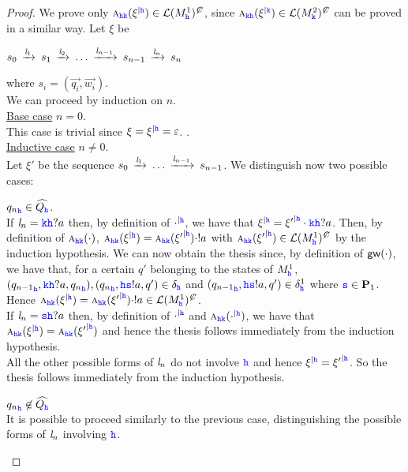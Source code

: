 \begin{proof}
We prove only $\symb{\HH\KK}{\restrictup{\xi}{\HH}}\in\lang{M^1_\HH}^\mC$, since 
$\symb{\KK\HH}{\restrictup{\xi}{\KK}}\in\lang{M^2_\KK}^\mC$ can be proved in a similar way.
Let $\xi$ be\\
\centerline{
$s_0\lts{\elle_1}s_1\lts{\elle_2} \ldots \lts{\elle_{n-1}}s_{n-1}\lts{\elle_n}s_n$
}
where $s_i=({\vec{q_i}},{\vec{w_i}})$.\\
We can proceed by  induction on $n$.\\
\underline{Base case} $n=0$. \\
This case is trivial since $\xi = \restrictup{\xi}{\HH}=\varepsilon$. .\\
\underline{Inductive case} $n\neq 0$.\\
Let $\xi'$ be the sequence $s_0\lts{\elle_1} \ldots \lts{\elle_{n-1}}s_{n-1}$.
We distinguish now two possible cases:
\begin{description}
\item 
${q_n}_\HH\in\widehat{Q_\HH}$.\\
If  $\elle_n = \KK\HH?a$ then, by definition of $\restrictup{\cdot}{\HH}$,
we have that $\restrictup{\xi}{\HH}= \restrictup{\xi'}{\HH}\cdot\KK\HH?a$. 
Then, by definition of $\symb{\HH\KK}{\cdot}$, 
$\symb{\HH\KK}{\restrictup{\xi}{\HH}}=\symb{\HH\KK}{\restrictup{\xi'}{\HH}}\cdot !a$ with
$\symb{\HH\KK}{\restrictup{\xi'}{\HH}}\in\lang{M^1_\HH}^\mC$ by the induction hypothesis.
We can now obtain the thesis since, by definition of $\gateway{\cdot}$, we have that, for a certain $q'$ belonging to the states of $M^1_\HH$, $({q_{n-1}}_\HH, \KK\HH?a, {q_n}_\HH), ({q_{n}}_\HH, \HH\tts!a, q') \in \delta_\HH$ and
 $({q_{n-1}}_\HH, \HH\tts!a, q') \in \delta^1_\HH$
 where $\tts \in \roles_1$. Hence $\symb{\HH\KK}{\restrictup{\xi}{\HH}} = \symb{\HH\KK}{\restrictup{\xi'}{\HH}}\cdot !a
\in \lang{M^1_\HH}^\mC$. \\
 If  $\elle_n = \tts\HH?a$ then, by definition of $\restrictup{\cdot}{\HH}$ and $\symb{\HH\KK}{\restrictup{\cdot}{\HH}}$, we have that $\symb{\HH\KK}{\restrictup{\xi}{\HH}}=\symb{\HH\KK}{\restrictup{\xi'}{\HH}}$
 and hence the thesis follows immediately from the induction hypothesis.\\
 All the other possible forms of $\elle_n$ do not involve $\HH$ and hence $\restrictup{\xi}{\HH}=\restrictup{\xi'}{\HH}$.
 So the thesis follows immediately from the induction hypothesis.
\item
${q_n}_\HH\not\in\widehat{Q_\HH}$\\
It is possible to proceed similarly to the previous case, distinguishing the possible forms of 
$\elle_n$ involving $\HH$.
\end{description}
\end{proof}



